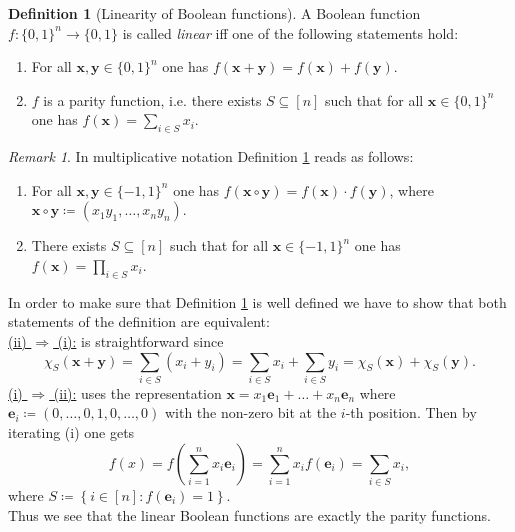 \documentclass[a4paper]{article}
\newcommand{\nset}{[n]}
\newcommand{\boldx}{\boldsymbol{x}}
\newcommand{\boldy}{\boldsymbol{y}}
\newcommand{\bolde}{\boldsymbol{e}}
\theoremstyle{plain}
\theoremstyle{definition}
\newtheorem{definition}{Definition}
\theoremstyle{remark}
\newtheorem*{remark*}{Remark}
\begin{document}
\begin{definition}[Linearity of Boolean functions] \label{def:1}
  A Boolean function \(f: \{0,1\}^n \rightarrow \{0,1\}\) is called \emph{linear}
  iff one of the following statements hold: 
  \begin{enumerate}[label= (\roman*)]
  \item For all \(\boldx,\boldy \in \{0,1\}^n\) one has
    \(f(\boldx+\boldy) = f(\boldx) + f(\boldy)\). 
  \item \(f\) is a parity function, i.e. there exists \(S \subseteq
    \nset\) such that for all \(\boldx \in \{0,1\}^n\) one has \(f(\boldx) =
    \sum_{i \in S}x_i\). 
  \end{enumerate}
\end{definition}

\begin{remark*}
  \noindent In multiplicative notation Definition \ref{def:1} reads as
  follows:
  \begin{enumerate}[label= (\roman*)]
  \item For all \(\boldx,\boldy \in \{-1,1\}^n\) one has
    \(f(\boldx\circ \boldy) = f(\boldx)\cdot f(\boldy)\), where
    \(\boldx\circ \boldy \coloneqq (x_1y_1, \dots, x_ny_n)\).
  \item There exists \(S \subseteq \nset\) such that for all
    \(\boldx\in \{-1,1\}^n\) one has \(f(\boldx) = \prod_{i\in S}
    x_i\).
  \end{enumerate}
\end{remark*}

\noindent In order to make sure that Definition
\ref{def:1} is well defined we have to show that both statements of
the definition are equivalent: \\
\underline{(ii) \(\Rightarrow\) (i):} is straightforward since 
\[\chi_S(\boldx+\boldy) = \sum_{i\in S} (x_i + y_i) = \sum_{i\in S} x_i +
\sum_{i\in S} y_i = \chi_S(\boldx) + \chi_S(\boldy).\]
\underline{(i) \(\Rightarrow\) (ii):} uses the representation \(\boldx =
x_1 \bolde_1 + \dots + x_n \bolde_n\) where \(\bolde_i \coloneqq
(0,\dots,0,1,0,\dots,0)\) with the non-zero bit at the \(i\)-th
position. Then by iterating (i) one gets 
\[f(x) = f\left(\sum_{i=1}^{n} x_i \bolde_i\right) = \sum_{i=1}^{n} x_i f(\bolde_i) =
\sum_{i\in S} x_i, \]
where \(S \coloneqq \left\{i\in \nset : f(\bolde_i) = 1 \right\}\). \\

\noindent Thus we see that the linear Boolean functions are exactly
the parity functions. 
\end{document}
